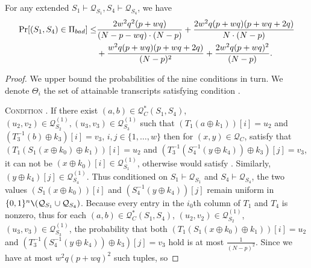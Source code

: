 \begin{lemma}
	\label{lemma:bad-outer-4-rounds}
	
	For any extended $S_{1} \vdash \mathcal{Q}_{S_{1}},S_{4} \vdash \mathcal{Q}_{S_{4}}$, we have
	\begin{align}
	\operatorname{Pr}[(S_1,S_4) \in \emph{$\Pi_{bad}$}] \leq  &\frac{2 w^{2} q^{2} (p+w q)}{(N- p- wq) \cdot (N-p)} +\frac{2 w^{2} q (p+w q)(p+w q+2 q)}{N \cdot (N-p)}\\
	& + \frac{w^{2} q (p+w q)(p+w q+2 q)}{(N-p)^2} + \frac{2 w^{2} q (p+w q)^{2}}{(N-p)}.
	\label{eq:bound-bad-outer-4-rounds}
	\end{align}
\end{lemma}
\begin{proof}
We upper bound the probabilities of the nine conditions in turn. We denote $\Theta_i$ the set of attainable transcripts satisfying condition \ci.


\noindent \textsc{Condition \cone}. If there exist $(a, b) \in \mathcal{Q}_{C}^{*}\left(S_{1}, S_{4}\right)$, $(u_{2}, v_{2}) \in \mathcal{Q}_{S_{2}}^{(1)}, (u_{3}, v_{3}) \in \mathcal{Q}_{S_{3}}^{(1)}$ such that $\left(T_1\left(a \oplus k_{1}\right)\right)[i] = u_2$ and $\left(T_{3}^{-1}\left(b\right) \oplus k_{3}\right)[i] = v_3$, $i, j \in\{1, \ldots, w\}$ then for $(x, y) \in \mathcal{Q}_{C}$, satisfy that $\left(T_{1}\left(S_{1}\left(x \oplus k_{0}\right) \oplus k_{1}\right)\right)[i]=u_2$ and $\left(T_{3}^{-1}\left(S_{4}^{-1}\left(y \oplus k_{4}\right)\right) \oplus k_{3}\right)[j]=v_3$, it can not be $\left(x \oplus k_{0}\right)[i] \in \mathcal{Q}_{S_{1}}^{(1)}$, otherwise would satisfy \btwo. Similarly, $\left(y \oplus k_{4}\right)[j] \in \mathcal{Q}_{S_{4}}^{(1)}$. Thus conditioned on $S_{1} \vdash \mathcal{Q}_{S_{1}}$ and $S_{4} \vdash \mathcal{Q}_{S_{4}}$, the two values $\left(S_{1}\left(x \oplus k_{0}\right)\right)[i]$ and $\left(S_{4}^{-1}\left(y \oplus k_{4}\right)\right)[j]$  remain uniform in $\{0, 1\}^{n} \verb|\| (\mathcal{Q}_{S_{1}} \cup \mathcal{Q}_{S_{4}})$. Because every entry in the $i_{0}$th column of $T_{1}$ and $T_{4}$ is nonzero, thus for each $(a, b) \in \mathcal{Q}_{C}^{*}\left(S_{1}, S_{4}\right)$, $(u_{2}, v_{2}) \in \mathcal{Q}_{S_{2}}^{(1)}$, $(u_{3}, v_{3}) \in \mathcal{Q}_{S_{3}}^{(1)}$, the probability that both $\left(T_{1}\left(S_{1}\left(x \oplus k_{0}\right) \oplus k_{1}\right)\right)[i]=u_2$ and $\left(T_{3}^{-1}\left(S_{4}^{-1}\left(y \oplus k_{4}\right)\right) \oplus k_{3}\right)[j]=v_3$ hold is at most $\frac{1}{(N-p)^{2}}$. Since we have at most $w^{2} q (p+w q)^{2}$ such tuples, so


\end{proof}
